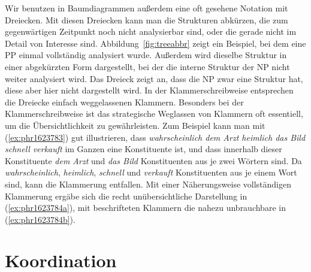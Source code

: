 Wir benutzen in Baumdiagrammen außerdem eine oft gesehene Notation mit Dreiecken.
Mit diesen Dreiecken kann man die Strukturen abkürzen, die zum gegenwärtigen Zeitpunkt noch nicht analysierbar sind, oder die gerade nicht im Detail von Interesse sind.
Abbildung~\ref{fig:treeabbr} zeigt ein Beispiel, bei dem eine PP einmal vollständig analysiert wurde.
Außerdem wird dieselbe Struktur in einer abgekürzten Form dargestellt, bei der die interne Struktur der NP nicht weiter analysiert wird.
Das Dreieck zeigt an, dass die NP zwar eine Struktur hat, diese aber hier nicht dargestellt wird.
In der Klammerschreibweise entsprechen die Dreiecke einfach weggelassenen Klammern.
Besonders bei der Klammerschreibweise ist das strategische Weglassen von Klammern oft essentiell, um die Übersichtlichkeit zu gewährleisten.
Zum Beispiel kann man mit (\ref{ex:phr1623783}) gut illustrieren, dass \textit{wahrscheinlich dem Arzt heimlich das Bild schnell verkauft} im Ganzen eine Konstituente ist, und dass innerhalb dieser Konstituente \textit{dem Arzt} und \textit{das Bild} Konstituenten aus je zwei Wörtern sind.
Da \textit{wahrscheinlich}, \textit{heimlich}, \textit{schnell} und \textit{verkauft} Konstituenten aus je einem Wort sind, kann die Klammerung entfallen.
Mit einer Näherungsweise vollständigen Klammerung ergäbe sich die recht unübersichtliche Darstellung in (\ref{ex:phr1623784a}), mit beschrifteten Klammern die nahezu unbrauchbare in (\ref{ex:phr1623784b}).

\begin{exe}
  \ex\label{ex:phr1623784}
  \begin{xlist}
  \end{xlist}
\end{exe}


\section{Koordination}

\label{sec:koor}

